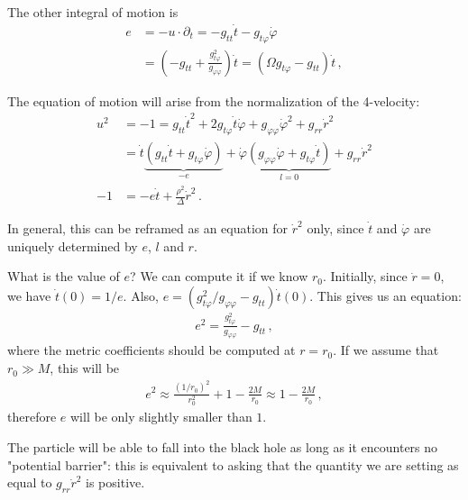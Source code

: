 \documentclass[main.tex]{subfiles}
\begin{document}
The other integral of motion is %
\begin{align} \label{eq:tdot-from-r}
e &= - u \cdot \partial_t = - g_{tt } \dot{t} - g_{t \varphi } \dot{\varphi}  \\
&= \left(- g_{tt} + \frac{g_{t \varphi }^2}{g_{\varphi \varphi}}\right) \dot{t} = (\Omega g_{t \varphi } - g_{tt}) \dot{t}
\,,
\end{align}
%

The equation of motion will arise from the normalization of the 4-velocity: %
\begin{align}
u^2 &= -1 = g_{tt} \dot{t}^2 + 2g_{t \varphi } \dot{t} \dot{\varphi} + g_{\varphi \varphi } \dot{\varphi}^2 + g_{rr} \dot{r}^2  \\
&= \dot{t} \underbrace{\left( g_{tt} \dot{t} + g_{t \varphi } \dot{\varphi}\right)}_{- e}
+ \dot{\varphi} \underbrace{\left( g_{\varphi \varphi } \dot{\varphi} + g_{t \varphi } \dot{t}\right)}_{l = 0} + g_{rr} \dot{r}^2  \\
-1 &= -e \dot{t} + \frac{\rho^2}{\Delta } \dot{r}^2
\,.
\end{align}

In general, this can be reframed as an equation for \(\dot{r}^2\) only, since \(\dot{t}\) and \(\dot{\varphi}\) are uniquely determined by \(e\), \(l\) and \(r\).

What is the value of \(e\)? We can compute it if we know \(r_0\).
Initially, since \(\dot{r} = 0\), we have \(\dot{t}(0) = 1 / e\).
Also, \(e = (g_{t \varphi }^2 / g_{\varphi \varphi } - g_{tt}) \dot{t}(0)\). This gives us an equation: %
\begin{align}
e^2 = \frac{g_{t \varphi }^2}{g_{\varphi \varphi }} - g_{tt}
\,,
\end{align}
%
where the metric coefficients should be computed at \(r = r_0\). 
If we assume that \(r_0 \gg M\), this will be 
%
\begin{align}
e^2 \approx \frac{(1 / r_0 )^2}{r_0^2} + 1 - \frac{2M}{r_0} \approx 1 - \frac{2M}{r_0 }
\,,
\end{align}
%
therefore \(e\) will be only slightly smaller than \(1\). 

The particle will be able to fall into the black hole as long as it encounters no "potential barrier": this is equivalent to asking that the quantity we are setting as equal to \(g_{rr}\dot{r}^2\) is positive.
\end{document}
